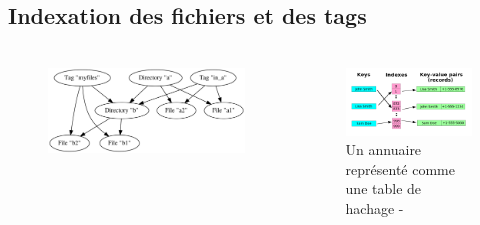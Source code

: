 \documentclass[10pt]{beamer}
\begin{document}
\subsection{Indexation des fichiers et des tags}
\begin{frame}
    \frametitle{\subsecname}
    \begin{columns}[T]
        \begin{column}{.5\textwidth}
            \begin{figure}
                \begin{center}
                    \includegraphics[width=1\textwidth]{images/graph.png}
                \end{center}
            \end{figure}
        \end{column}
        \pause
        \begin{column}{.5\textwidth}
            \begin{figure}
                \begin{center}
                    \includegraphics[width=1\textwidth]{images/hashmap_wiki.png}
                    \caption{Un annuaire représenté comme une table de hachage - \cite{ref27}}
                \end{center}
            \end{figure}
        \end{column}
    \end{columns}
\end{frame}
\end{document}

